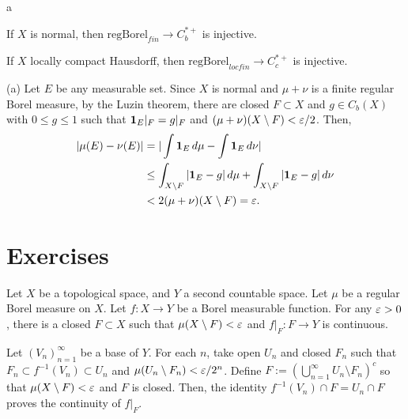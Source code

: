\documentclass{../note}
\begin{document}
\begin{prb}
a
\begin{parts}
\item If $X$ is normal, then $\text{regBorel}_{fin}\to C_b^{*+}$ is injective.
\item If $X$ locally compact Hausdorff, then $\text{regBorel}_{locfin}\to C_c^{*+}$ is injective.
\end{parts}
\end{prb}
\begin{pf}
(a)
Let $E$ be any measurable set.
Since $X$ is normal and $\mu+\nu$ is a finite regular Borel measure, by the Luzin theorem, there are closed $F\subset X$ and $g\in C_b(X)$ with $0\le g\le1$ such that $\mathbf{1}_E|_F=g|_F$ and $(\mu+\nu)(X\setminus F)<\varepsilon/2$.
Then,
\begin{align*}
|\mu(E)-\nu(E)|&=|\int\mathbf{1}_E\,d\mu-\int\mathbf{1}_E\,d\nu|\\
&\le\int_{X\setminus F}|\mathbf{1}_E-g|\,d\mu+\int_{X\setminus F}|\mathbf{1}_E-g|\,d\nu\\
&<2(\mu+\nu)(X\setminus F)=\varepsilon.
\end{align*}

\end{pf}


\begin{prb}
\end{prb}



\section*{Exercises}

\begin{prb}
Let $X$ be a topological space, and $Y$ a second countable space.
Let $\mu$ be a regular Borel measure on $X$.
Let $f:X\to Y$ be a Borel measurable function.
For any $\varepsilon>0$, there is a closed $F\subset X$ such that $\mu(X\setminus F)<\varepsilon$ and $f|_F:F\to Y$ is continuous.
\end{prb}
\begin{pf}
Let $(V_n)_{n=1}^\infty$ be a base of $Y$.
For each $n$, take open $U_n$ and closed $F_n$ such that $F_n\subset f^{-1}(V_n)\subset U_n$ and $\mu(U_n\setminus F_n)<\varepsilon/2^n$.
Define $F:=\left(\bigcup_{n=1}^\infty U_n\setminus F_n\right)^c$ so that $\mu(X\setminus F)<\varepsilon$ and $F$ is closed.
Then, the identity $f^{-1}(V_n)\cap F=U_n\cap F$ proves the continuity of $f|_F$.
\end{pf}
\end{document}
